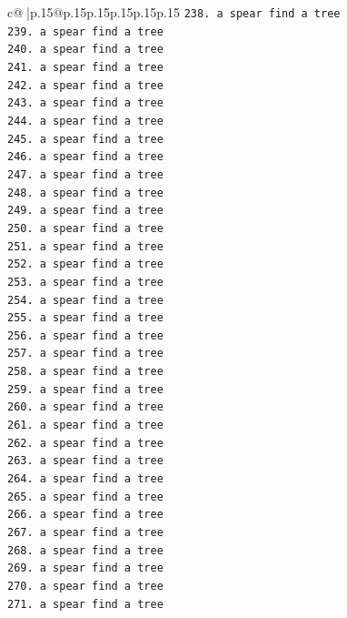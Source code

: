 \documentclass{article}
\begin{document}
{\begin{supertabular}{c@{$\;$}|p{.15\linewidth}@{}p{.15\linewidth}p{.15\linewidth}p{.15\linewidth}p{.15\linewidth}p{.15\linewidth}}
{{{\texttt{238. a spear find a tree} \\
\texttt{239. a spear find a tree} \\
\texttt{240. a spear find a tree} \\
\texttt{241. a spear find a tree} \\
\texttt{242. a spear find a tree} \\
\texttt{243. a spear find a tree} \\
\texttt{244. a spear find a tree} \\
\texttt{245. a spear find a tree} \\
\texttt{246. a spear find a tree} \\
\texttt{247. a spear find a tree} \\
\texttt{248. a spear find a tree} \\
\texttt{249. a spear find a tree} \\
\texttt{250. a spear find a tree} \\
\texttt{251. a spear find a tree} \\
\texttt{252. a spear find a tree} \\
\texttt{253. a spear find a tree} \\
\texttt{254. a spear find a tree} \\
\texttt{255. a spear find a tree} \\
\texttt{256. a spear find a tree} \\
\texttt{257. a spear find a tree} \\
\texttt{258. a spear find a tree} \\
\texttt{259. a spear find a tree} \\
\texttt{260. a spear find a tree} \\
\texttt{261. a spear find a tree} \\
\texttt{262. a spear find a tree} \\
\texttt{263. a spear find a tree} \\
\texttt{264. a spear find a tree} \\
\texttt{265. a spear find a tree} \\
\texttt{266. a spear find a tree} \\
\texttt{267. a spear find a tree} \\
\texttt{268. a spear find a tree} \\
\texttt{269. a spear find a tree} \\
\texttt{270. a spear find a tree} \\
\texttt{271. a spear find a tree} \\
}}}
\end{supertabular}}
\end{document}
